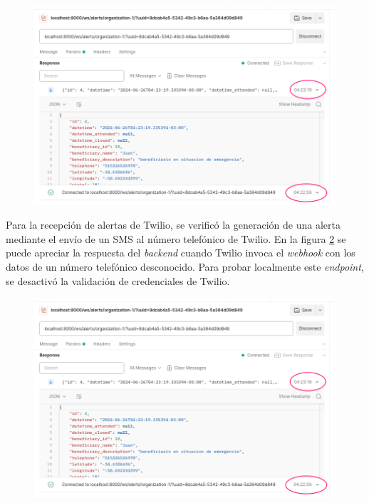 \begin{figure}[H]
	\centering
  	\includegraphics[width=1\linewidth]{./Figures/postman2.png}
  	\label{fig:postman2}
\end{figure}

Para la recepción de alertas de Twilio, se verificó la generación de una alerta mediante el envío de un SMS al número telefónico de Twilio. En la figura \ref{fig:backend-twilio} se puede apreciar la respuesta del \textit{backend} cuando Twilio invoca el \textit{webhook} con los datos de un número telefónico desconocido. Para probar localmente este \textit{endpoint}, se desactivó la validación de credenciales de Twilio.

\begin{figure}[H]
	\centering
  	\includegraphics[width=1\linewidth]{./Figures/postman2.png}
  	\label{fig:backend-twilio}
\end{figure}

